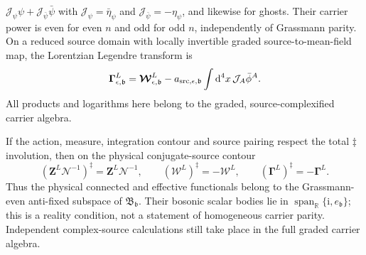 \documentclass[final,5p,times,twocolumn,numbers,nopreprintline]{elsarticle}
\numberwithin{equation}{section}
\theoremstyle{definition}
\theoremstyle{remark}
\newcommand{\dd}{\mathop{}\!\mathrm d}
\newcommand{\ii}{\mathrm i}
\newcommand{\bb}{\mathfrak b}
\newcommand{\RR}{\mathbb R}
\newcommand{\vct}[1]{\boldsymbol{#1}}
\newcommand{\ee}{e_{\bb}}
\begin{document}
\(\mathcal J_\psi\psi+\mathcal J_{\bar\psi}\bar\psi\) with
\(\mathcal J_\psi=\bar\eta_\psi\) and
\(\mathcal J_{\bar\psi}=-\eta_\psi\), and likewise for ghosts.
Their carrier power is even for even \(n\) and odd for odd \(n\),
independently of Grassmann parity. On a reduced source domain with
locally invertible graded source-to-mean-field map, the Lorentzian
Legendre transform is
\begin{equation}
 \vct\Gamma^L_{\epsilon,\bb}
  =\vct{\mathcal W}^L_{\epsilon,\bb}
   -a_{{\rm src},\epsilon,\bb}
        \int\dd^4x\,\mathcal J_A\bar\phi^A .
 \label{eq:physical-L-Legendre}
\end{equation}
All products and logarithms here belong to the graded,
source-complexified carrier algebra.

If the action, measure, integration contour and source pairing
respect the total \(\ddagger\) involution, then on the physical
conjugate-source contour
\[
 (\vct Z^L\vct{\mathcal N}^{-1})^\ddagger
       =\vct Z^L\vct{\mathcal N}^{-1},\qquad
 (\vct{\mathcal W}^L)^\ddagger=-\vct{\mathcal W}^L,\qquad
 (\vct\Gamma^L)^\ddagger=-\vct\Gamma^L .
\]
Thus the physical connected and effective functionals belong to
the Grassmann-even anti-fixed subspace of \(\mathfrak B_{\bb}\).
Their bosonic scalar bodies lie in
\(\operatorname{span}_{\RR}\{\ii,\ee\}\); this is a reality
condition, not a statement of homogeneous carrier parity.
Independent complex-source calculations still take place in the
full graded carrier algebra.
\end{document}
